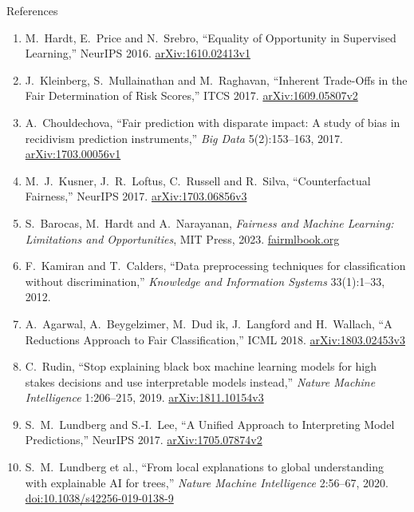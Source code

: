 \begin{frame}[allowframebreaks]{References}
\begin{enumerate}
          ITCS 2012. \href{https://arxiv.org/abs/1104.3913v2}{arXiv:1104.3913v2}
    \item M.~Hardt, E.~Price and N.~Srebro, ``Equality of Opportunity in Supervised Learning,''
          NeurIPS 2016. \href{https://arxiv.org/abs/1610.02413v1}{arXiv:1610.02413v1}
    \item J.~Kleinberg, S.~Mullainathan and M.~Raghavan, ``Inherent Trade-Offs in the Fair
          Determination of Risk Scores,'' ITCS 2017.
          \href{https://arxiv.org/abs/1609.05807v2}{arXiv:1609.05807v2}
    \item A.~Chouldechova, ``Fair prediction with disparate impact: A study of bias in recidivism
          prediction instruments,'' \emph{Big Data} 5(2):153--163, 2017.
          \href{https://arxiv.org/abs/1703.00056v1}{arXiv:1703.00056v1}
    \item M.~J.~Kusner, J.~R.~Loftus, C.~Russell and R.~Silva, ``Counterfactual Fairness,''
          NeurIPS 2017. \href{https://arxiv.org/abs/1703.06856v3}{arXiv:1703.06856v3}
    \item S.~Barocas, M.~Hardt and A.~Narayanan, \emph{Fairness and Machine Learning: Limitations
          and Opportunities}, MIT Press, 2023. \href{https://fairmlbook.org/}{fairmlbook.org}
    \item F.~Kamiran and T.~Calders, ``Data preprocessing techniques for classification without
          discrimination,'' \emph{Knowledge and Information Systems} 33(1):1--33, 2012.
    \item A.~Agarwal, A.~Beygelzimer, M.~Dud ik, J.~Langford and H.~Wallach, ``A Reductions
          Approach to Fair Classification,'' ICML 2018.
          \href{https://arxiv.org/abs/1803.02453v3}{arXiv:1803.02453v3}
    \item C.~Rudin, ``Stop explaining black box machine learning models for high stakes decisions
          and use interpretable models instead,'' \emph{Nature Machine Intelligence} 1:206--215,
          2019. \href{https://arxiv.org/abs/1811.10154v3}{arXiv:1811.10154v3}
    \item S.~M.~Lundberg and S.-I.~Lee, ``A Unified Approach to Interpreting Model Predictions,''
          NeurIPS 2017. \href{https://arxiv.org/abs/1705.07874v2}{arXiv:1705.07874v2}
    \item S.~M.~Lundberg et al., ``From local explanations to global understanding with explainable
          AI for trees,'' \emph{Nature Machine Intelligence} 2:56--67, 2020.
          \href{https://doi.org/10.1038/s42256-019-0138-9}{doi:10.1038/s42256-019-0138-9}

\end{enumerate}
\end{frame}
